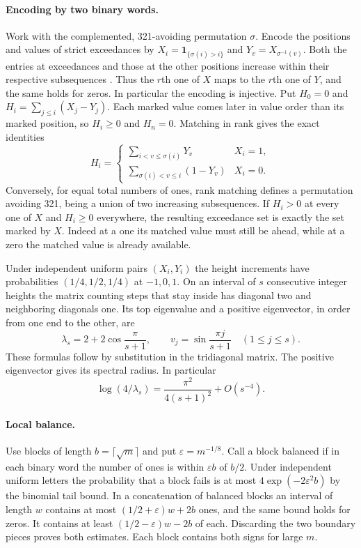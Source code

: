 \documentclass[11pt]{article}
\begin{document}
\paragraph{Encoding by two binary words.}
Work with the complemented, 321-avoiding permutation $\sigma$. Encode the positions and values of strict exceedances by $X_i=\mathbf1_{\{\sigma(i)>i\}}$ and $Y_v=X_{\sigma^{-1}(v)}$. Both the entries at exceedances and those at the other positions increase within their respective subsequences \cite[\S2]{hrs}. Thus the $r$th one of $X$ maps to the $r$th one of $Y$, and the same holds for zeros. In particular the encoding is injective. Put $H_0=0$ and $H_i=\sum_{j\le i}(X_j-Y_j)$. Each marked value comes later in value order than its marked position, so $H_i\ge0$ and $H_n=0$. Matching in rank gives the exact identities
\[
 H_i=\begin{cases}
 \displaystyle\sum_{i<v\le\sigma(i)}Y_v & X_i=1,\\[3pt]
 \displaystyle\sum_{\sigma(i)<v\le i}(1-Y_v) & X_i=0 .
 \end{cases}                                                     \tag{1}
\]
Conversely, for equal total numbers of ones, rank matching defines a permutation avoiding 321, being a union of two increasing subsequences. If $H_i>0$ at every one of $X$ and $H_i\ge0$ everywhere, the resulting exceedance set is exactly the set marked by $X$. Indeed at a one its matched value must still be ahead, while at a zero the matched value is already available.

Under independent uniform pairs $(X_i,Y_i)$ the height increments have probabilities $(1/4,1/2,1/4)$ at $-1,0,1$. On an interval of $s$ consecutive integer heights the matrix counting steps that stay inside has diagonal two and neighboring diagonals one. Its top eigenvalue and a positive eigenvector, in order from one end to the other, are
\[
 \lambda_s=2+2\cos\frac{\pi}{s+1},\qquad
 v_j=\sin\frac{\pi j}{s+1}\quad(1\le j\le s).
\]
These formulas follow by substitution in the tridiagonal matrix. The positive eigenvector gives its spectral radius. In particular
\[
 \log(4/\lambda_s)=\frac{\pi^2}{4(s+1)^2}+O(s^{-4}).             \tag{2}
\]

\paragraph{Local balance.}
Use blocks of length $b=\lceil\sqrt m\rceil$ and put $\varepsilon=m^{-1/8}$. Call a block balanced if in each binary word the number of ones is within $\varepsilon b$ of $b/2$. Under independent uniform letters the probability that a block fails is at most $4\exp(-2\varepsilon^2b)$ by the binomial tail bound. In a concatenation of balanced blocks an interval of length $w$ contains at most $(1/2+\varepsilon)w+2b$ ones, and the same bound holds for zeros. It contains at least $(1/2-\varepsilon)w-2b$ of each. Discarding the two boundary pieces proves both estimates. Each block contains both signs for large $m$.
\end{document}
